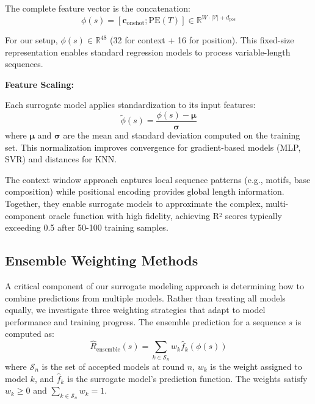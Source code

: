 \documentclass[conference]{IEEEtran}
\begin{document}
The complete feature vector is the concatenation:
\begin{equation}
\phi(s) = [\mathbf{c}_{\text{onehot}}; \text{PE}(T)] \in \mathbb{R}^{W \cdot |\mathcal{V}| + d_{\text{pos}}}
\end{equation}

For our setup, $\phi(s) \in \mathbb{R}^{48}$ (32 for context + 16 for position). This fixed-size representation enables standard regression models to process variable-length sequences.

\textbf{Feature Scaling:}

Each surrogate model applies standardization to its input features:
\begin{equation}
\tilde{\phi}(s) = \frac{\phi(s) - \boldsymbol{\mu}}{\boldsymbol{\sigma}}
\end{equation}
where $\boldsymbol{\mu}$ and $\boldsymbol{\sigma}$ are the mean and standard deviation computed on the training set. This normalization improves convergence for gradient-based models (MLP, SVR) and distances for KNN.

The context window approach captures local sequence patterns (e.g., motifs, base composition) while positional encoding provides global length information. Together, they enable surrogate models to approximate the complex, multi-component oracle function with high fidelity, achieving R² scores typically exceeding 0.5 after 50-100 training samples.






\subsection{Ensemble Weighting Methods}

A critical component of our surrogate modeling approach is determining how to combine predictions from multiple models. Rather than treating all models equally, we investigate three weighting strategies that adapt to model performance and training progress. The ensemble prediction for a sequence $s$ is computed as:
\begin{equation}
\hat{R}_{\text{ensemble}}(s) = \sum_{k \in \mathcal{S}_n} w_k \hat{f}_k(\phi(s))
\end{equation}
where $\mathcal{S}_n$ is the set of accepted models at round $n$, $w_k$ is the weight assigned to model $k$, and $\hat{f}_k$ is the surrogate model's prediction function. The weights satisfy $w_k \geq 0$ and $\sum_{k \in \mathcal{S}_n} w_k = 1$.
\end{document}
